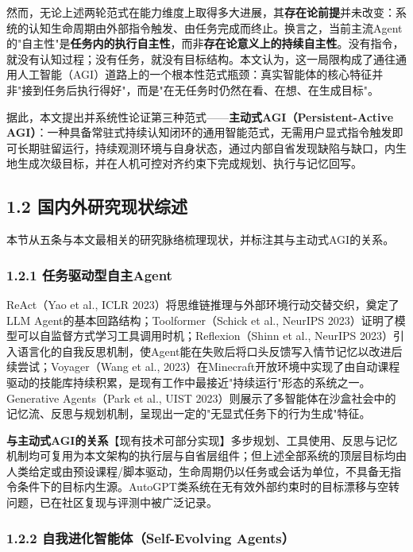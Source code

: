 \documentclass[11pt,a4paper]{ctexart}
\begin{document}
然而，无论上述两轮范式在能力维度上取得多大进展，其\textbf{存在论前提}并未改变：系统的认知生命周期由外部指令触发、由任务完成而终止。换言之，当前主流Agent的"自主性"是\textbf{任务内的执行自主性}，而非\textbf{存在论意义上的持续自主性}。没有指令，就没有认知过程；没有任务，就没有目标结构。本文认为，这一局限构成了通往通用人工智能（AGI）道路上的一个根本性范式瓶颈：真实智能体的核心特征并非"接到任务后执行得好"，而是"在无任务时仍然在看、在想、在生成目标"。

据此，本文提出并系统性论证第三种范式——\textbf{主动式AGI（Persistent-Active AGI）}：一种具备常驻式持续认知闭环的通用智能范式，无需用户显式指令触发即可长期驻留运行，持续观测环境与自身状态，通过内部自省发现缺陷与缺口，内生地生成次级目标，并在人机可控对齐约束下完成规划、执行与记忆回写。

\subsection{1.2 国内外研究现状综述}

本节从五条与本文最相关的研究脉络梳理现状，并标注其与主动式AGI的关系。

\subsubsection{1.2.1 任务驱动型自主Agent}

ReAct（Yao et al., ICLR 2023）将思维链推理与外部环境行动交替交织，奠定了LLM Agent的基本回路结构；Toolformer（Schick et al., NeurIPS 2023）证明了模型可以自监督方式学习工具调用时机；Reflexion（Shinn et al., NeurIPS 2023）引入语言化的自我反思机制，使Agent能在失败后将口头反馈写入情节记忆以改进后续尝试；Voyager（Wang et al., 2023）在Minecraft开放环境中实现了由自动课程驱动的技能库持续积累，是现有工作中最接近"持续运行"形态的系统之一。Generative Agents（Park et al., UIST 2023）则展示了多智能体在沙盒社会中的记忆流、反思与规划机制，呈现出一定的"无显式任务下的行为生成"特征。

\textbf{与主动式AGI的关系}【现有技术可部分实现】多步规划、工具使用、反思与记忆机制均可复用为本文架构的执行层与自省层组件；但上述全部系统的顶层目标均由人类给定或由预设课程/脚本驱动，生命周期仍以任务或会话为单位，不具备无指令条件下的目标内生源。AutoGPT类系统在无有效外部约束时的目标漂移与空转问题，已在社区复现与评测中被广泛记录。

\subsubsection{1.2.2 自我进化智能体（Self-Evolving Agents）}
\end{document}

